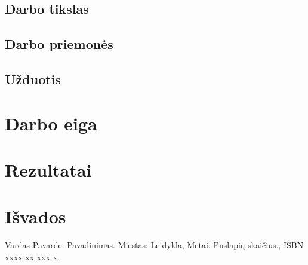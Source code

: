 \documentclass[a4paper, 12pt]{article}
\begin{document}
\subsection{Darbo tikslas}
\lipsum[1]

\subsection{Darbo priemonės}
\lipsum[2]

\subsection{Užduotis}
\lipsum[3]


\section{Darbo eiga}
\lipsum[4]


\section{Rezultatai}
\lipsum[5]


\section{Išvados}
\lipsum[6]


\newpage




\begin{thebibliography}{99}
 Vardas Pavarde. Pavadinimas. Miestas: Leidykla, Metai. Puslapių skaičius., ISBN xxxx-xx-xxx-x.
\end{thebibliography}
\end{document}
